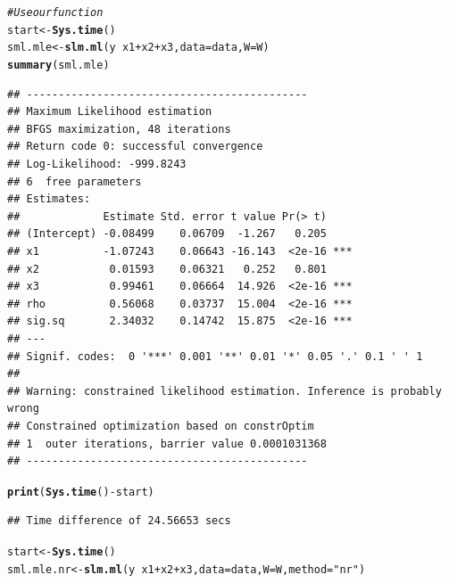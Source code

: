 \documentclass[english,12pt]{book}\usepackage[]{graphicx}\usepackage[]{xcolor}
\makeatletter
\newcommand{\hlstr}[1]{\textcolor[rgb]{0.192,0.494,0.8}{#1}}%
\newcommand{\hlcom}[1]{\textcolor[rgb]{0.678,0.584,0.686}{\textit{#1}}}%
\newcommand{\hlopt}[1]{\textcolor[rgb]{0,0,0}{#1}}%
\newcommand{\hlstd}[1]{\textcolor[rgb]{0.345,0.345,0.345}{#1}}%
\newcommand{\hlkwb}[1]{\textcolor[rgb]{0.69,0.353,0.396}{#1}}%
\newcommand{\hlkwc}[1]{\textcolor[rgb]{0.333,0.667,0.333}{#1}}%
\newcommand{\hlkwd}[1]{\textcolor[rgb]{0.737,0.353,0.396}{\textbf{#1}}}%
\newenvironment{kframe}{%
 \def\at@end@of@kframe{}%
 \ifinner\ifhmode%
  \def\at@end@of@kframe{\end{minipage}}%
  \begin{minipage}{\columnwidth}%
 \fi\fi%
 \def\FrameCommand##1{\hskip\@totalleftmargin \hskip-\fboxsep
 \colorbox{shadecolor}{##1}\hskip-\fboxsep
     \hskip-\linewidth \hskip-\@totalleftmargin \hskip\columnwidth}%
 \MakeFramed {\advance\hsize-\width
   \@totalleftmargin\z@ \linewidth\hsize
   \@setminipage}}%
 {\par\unskip\endMakeFramed%
 \at@end@of@kframe}
\newenvironment{knitrout}{}{} %
\makeatother
\begin{document}
\begin{knitrout}
\color{fgcolor}\begin{kframe}
\begin{alltt}
\hlcom{# Use our function }
\hlstd{start} \hlkwb{<-} \hlkwd{Sys.time}\hlstd{()}
\hlstd{sml.mle} \hlkwb{<-} \hlkwd{slm.ml}\hlstd{(y} \hlopt{~} \hlstd{x1} \hlopt{+} \hlstd{x2} \hlopt{+}  \hlstd{x3,} \hlkwc{data} \hlstd{= data,} \hlkwc{W} \hlstd{= W)}
\hlkwd{summary}\hlstd{(sml.mle)}
\end{alltt}
\begin{verbatim}
## --------------------------------------------
## Maximum Likelihood estimation
## BFGS maximization, 48 iterations
## Return code 0: successful convergence 
## Log-Likelihood: -999.8243 
## 6  free parameters
## Estimates:
##             Estimate Std. error t value Pr(> t)    
## (Intercept) -0.08499    0.06709  -1.267   0.205    
## x1          -1.07243    0.06643 -16.143  <2e-16 ***
## x2           0.01593    0.06321   0.252   0.801    
## x3           0.99461    0.06664  14.926  <2e-16 ***
## rho          0.56068    0.03737  15.004  <2e-16 ***
## sig.sq       2.34032    0.14742  15.875  <2e-16 ***
## ---
## Signif. codes:  0 '***' 0.001 '**' 0.01 '*' 0.05 '.' 0.1 ' ' 1
## 
## Warning: constrained likelihood estimation. Inference is probably wrong
## Constrained optimization based on constrOptim 
## 1  outer iterations, barrier value 0.0001031368 
## --------------------------------------------
\end{verbatim}
\begin{alltt}
\hlkwd{print}\hlstd{(}\hlkwd{Sys.time}\hlstd{()}\hlopt{-} \hlstd{start)}
\end{alltt}
\begin{verbatim}
## Time difference of 24.56653 secs
\end{verbatim}
\begin{alltt}
\hlstd{start} \hlkwb{<-} \hlkwd{Sys.time}\hlstd{()}
\hlstd{sml.mle.nr} \hlkwb{<-} \hlkwd{slm.ml}\hlstd{(y} \hlopt{~} \hlstd{x1} \hlopt{+} \hlstd{x2} \hlopt{+}  \hlstd{x3,} \hlkwc{data} \hlstd{= data,} \hlkwc{W} \hlstd{= W,} \hlkwc{method} \hlstd{=} \hlstr{"nr"}\hlstd{)}
\end{alltt}



\end{kframe}
\end{knitrout}
\end{document}
